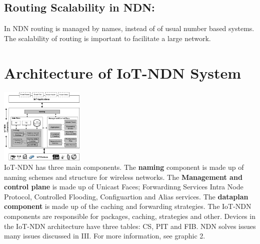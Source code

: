 \documentclass[conference]{IEEEtran}
\begin{document}
\subsection{Routing Scalability in NDN:}
In NDN routing is managed by names, instead of of usual number based systems. The scalability of routing is important to facilitate a large network.

\section{Architecture of IoT-NDN System}

\includegraphics[width=0.3\textwidth]{IoT-NDN_System_architecture_and_its_components.png}\\
IoT-NDN has three main components. The \textbf{naming} component is made up of naming schemes and structure for wireless networks.
The \textbf{Management and control plane} is made up of Unicast Faces; Forwardinng Services Intra Node Protocol, Controlled Flooding, Configuartion and Alias services. %
The \textbf{dataplan component} is made up of the caching and forwarding strategies.
The IoT-NDN components are responsible for packages, caching, strategies and other. %
Devices in the IoT-NDN architecture have three tables: CS, PIT and FIB.
NDN solves issues many issues discussed in III. For more information, see graphic 2.
\end{document}
